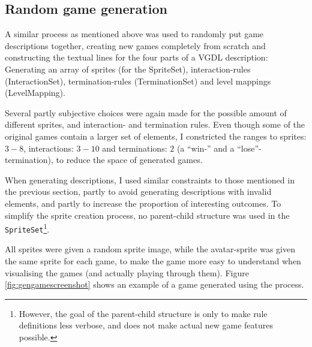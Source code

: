\documentclass[a4paper,titlepage,final]{report}
\begin{document}
\subsection{Random game generation}
\label{ssec_task1rndGen}
A similar process as mentioned above was used to randomly put game descriptions together, creating new games completely from scratch and constructing the textual lines for the four parts of a VGDL description: Generating an array of sprites (for the SpriteSet), interaction-rules (InteractionSet), termination-rules (TerminationSet) and level mappings (LevelMapping). 

Several partly subjective choices were again made for the possible amount of different sprites, and interaction- and termination rules. 
Even though some of the original games contain a larger set of elements, I constricted the ranges to sprites: ${3-8}$, interactions: ${3-10}$ and terminations: ${2}$ (a ``win-'' and a ``lose''-termination), to reduce the space of generated games.

When generating descriptions, I used similar constraints to those mentioned in the previous section, partly to avoid generating descriptions with invalid elements, and partly to increase the proportion of interesting outcomes. 
To simplify the sprite creation process, no parent-child structure was used in the \texttt{SpriteSet}\footnote{However, the goal of the parent-child structure is only to make rule definitions less verbose, and does not make actual new game features possible.}.

All sprites were given a random sprite image, while the avatar-sprite was given the same sprite for each game, to make the game more easy to understand when visualising the games (and actually playing through them).
Figure \ref{fig:gengamescreenshot} shows an example of a game generated using the process.
\end{document}
